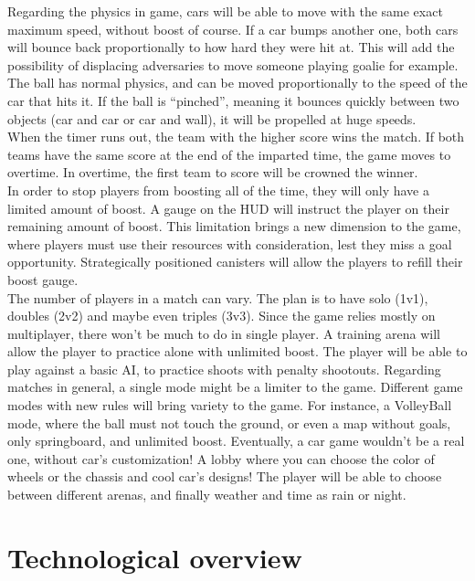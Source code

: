 Regarding the physics in game, cars will be able to move with the same exact maximum speed, without boost of course. If a car bumps another one, both cars will bounce back proportionally to how hard they were hit at. This will add the possibility of displacing adversaries to move someone playing goalie for example. The ball has normal physics, and can be moved proportionally to the speed of the car that hits it. If the ball is “pinched”, meaning it bounces quickly between two objects (car and car or car and wall), it will be propelled at huge speeds.\\ 

When the timer runs out, the team with the higher score wins the match. If both teams have the same score at the end of the imparted time, the game moves to overtime. In overtime, the first team to score will be crowned the winner.\\

In order to stop players from boosting all of the time, they will only have a limited amount of boost. A gauge on the HUD will instruct the player on their remaining amount of boost. This limitation brings a new dimension to the game, where players must use their resources with consideration, lest they miss a goal opportunity. Strategically positioned canisters will allow the players to refill their boost gauge.\\

The number of players in a match can vary. The plan is to have solo (1v1), doubles (2v2) and maybe even triples (3v3). Since the game relies mostly on multiplayer, there won’t be much to do in single player. A training arena will allow the player to practice alone with unlimited boost. The player will be able to play against a basic AI, to practice shoots with penalty shootouts.
Regarding matches in general, a single mode might be a limiter to the game. Different game modes with new rules will bring variety to the game. For instance, a VolleyBall mode, where the ball must not touch the ground, or even a map without goals, only springboard, and unlimited boost.
Eventually, a car game wouldn’t be a real one, without car’s customization! A lobby where you can choose the color of wheels or the chassis and cool car’s designs!
The player will be able to choose between different arenas, and finally weather and time as rain or night. \\


\chapter{Technological overview}

